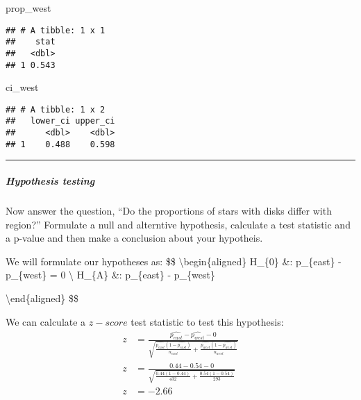 \documentclass[]{article}
\newenvironment{Shaded}{\begin{snugshade}}{\end{snugshade}}
\newcommand{\CommentTok}[1]{\textcolor[rgb]{0.56,0.35,0.01}{\textit{#1}}}
\newcommand{\NormalTok}[1]{#1}
\let\oldsubparagraph\subparagraph
\renewcommand{\subparagraph}[1]{\oldsubparagraph{#1}\mbox{}}
\begin{document}
\begin{Shaded}
\begin{Highlighting}[]
\NormalTok{prop_west}
\end{Highlighting}
\end{Shaded}

\begin{verbatim}
## # A tibble: 1 x 1
##    stat
##   <dbl>
## 1 0.543
\end{verbatim}

\begin{Shaded}
\begin{Highlighting}[]
\NormalTok{ci_west}
\end{Highlighting}
\end{Shaded}

\begin{verbatim}
## # A tibble: 1 x 2
##   lower_ci upper_ci
##      <dbl>    <dbl>
## 1    0.488    0.598
\end{verbatim}

\begin{Shaded}
\end{Shaded}

\begin{center}\rule{0.5\linewidth}{\linethickness}\end{center}

\hypertarget{hypothesis-testing}{%
\subparagraph{Hypothesis testing}\label{hypothesis-testing}}

Now answer the question, ``Do the proportions of stars with disks differ
with region?'' Formulate a null and alterntive hypothesis, calculate a
test statistic and a p-value and then make a conclusion about your
hypotheis.

We will formulate our hypotheses as: \$\$
\textbackslash{}begin\{aligned\} H\_\{0\} \&: p\_\{east\} - p\_\{west\}
= 0 \textbackslash{} H\_\{A\} \&: p\_\{east\} - p\_\{west\} 

\textbackslash{}end\{aligned\} \$\$

We can calculate a \(z-score\) test statistic to test this hypothesis:
\[
\begin{aligned}
z & = \frac{\hat{p_{east}} - \hat{p_{west}} - 0}{\sqrt{\frac{\hat{p_{east}}(1-\hat{p_{east}})}{n_{east}} + 
    \frac{\hat{p_{west}}(1-\hat{p_{west}})}{n_{west}}}} \\
z & = \frac{0.44 - 0.54 - 0}{\sqrt{\frac{0.44(1-0.44)}{432} + 
    \frac{0.54(1-0.54)}{293}}} \\
z & = -2.66
\end{aligned}
\]
\end{document}
